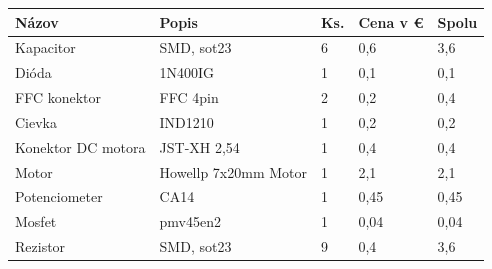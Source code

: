 \begin{table}
	\begin{tabular}{p{} p{} p{} p{} p{}}
		\hline
		\multicolumn{1}{|l}{\textbf{Názov}} & \textbf{Popis}                                     & \multicolumn{1}{l}{\textbf{Ks.}} & \multicolumn{1}{l}{\textbf{Cena v \euro}} & \multicolumn{1}{l|}{\textbf{Spolu}} \\ \hline
		Kapacitor                           & SMD, sot23                                         & 6                                  & 0,6                                      & 3,6                                        \\
		Dióda                               & 1N400IG                                            & 1                                  & 0,1                                      & 0,1                                        \\
		FFC konektor                        & FFC 4pin                                           & 2                                  & 0,2                                      & 0,4                                        \\
		Cievka                              & IND1210                                            & 1                                  & 0,2                                      & 0,2                                        \\
		Konektor DC motora                  & JST-XH 2,54                                        & 1                                  & 0,4                                      & 0,4                                        \\
		Motor                               & Howellp 7x20mm Motor                               & 1                                  & 2,1                                      & 2,1                                        \\
		Potenciometer                       & CA14                                               & 1                                  & 0,45                                     & 0,45                                       \\
		Mosfet                              & pmv45en2                                           & 1                                  & 0,04                                     & 0,04                                       \\
		Rezistor                            & SMD, sot23                                         & 9                                  & 0,4                                      & 3,6                                        \\

\end{tabular}
\end{table}
